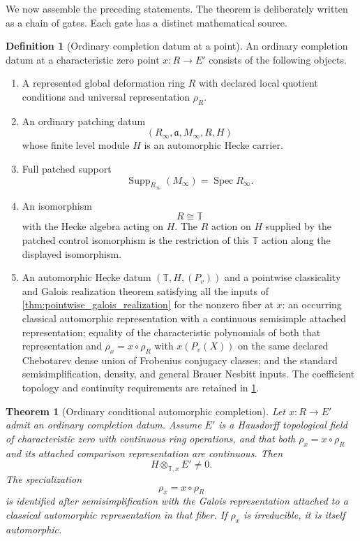 \documentclass[11pt]{amsart}
\newtheorem{theorem}{Theorem}[section]
\theoremstyle{definition}
\newtheorem{definition}[definition]{Definition}
\theoremstyle{remark}
\newcommand{\TT}{\mathbb T}
\newcommand{\Spec}{\operatorname{Spec}}
\newcommand{\Supp}{\operatorname{Supp}}
\newcommand{\fraka}{\mathfrak a}
\begin{document}
We now assemble the preceding statements. The theorem is deliberately written as a chain of gates. Each gate has a distinct mathematical source.

\begin{definition}[Ordinary completion datum at a point]\label{def:ordinary_completion_datum}
An ordinary completion datum at a characteristic zero point \(x:R\to E'\) consists of the following objects.
\begin{enumerate}
\item A represented global deformation ring \(R\) with declared local quotient conditions and universal representation \(\rho_R\).
\item An ordinary patching datum
\[
(R_\infty,\fraka,M_\infty,R,H)
\]
whose finite level module \(H\) is an automorphic Hecke carrier.
\item Full patched support
\[
\Supp_{R_\infty}(M_\infty)=\Spec R_\infty.
\]
\item An isomorphism
\[
R\cong\TT
\]
with the Hecke algebra acting on \(H\). The \(R\) action on \(H\) supplied by the patched control isomorphism is the restriction of this \(\TT\) action along the displayed isomorphism.
\item An automorphic Hecke datum \((\TT,H,(P_v))\) and a pointwise classicality and Galois realization theorem satisfying all the inputs of \cref{thm:pointwise_galois_realization} for the nonzero fiber at \(x\): an occurring classical automorphic representation with a continuous semisimple attached representation; equality of the characteristic polynomials of both that representation and \(\rho_x=x\circ\rho_R\) with \(x(P_v(X))\) on the same declared Chebotarev dense union of Frobenius conjugacy classes; and the standard semisimplification, density, and general Brauer Nesbitt inputs. The coefficient topology and continuity requirements are retained in \cref{thm:ordinary_conditional_completion}.
\end{enumerate}
\end{definition}

\begin{theorem}[Ordinary conditional automorphic completion]\label{thm:ordinary_conditional_completion}
Let \(x:R\to E'\) admit an ordinary completion datum. Assume \(E'\) is a Hausdorff topological field of characteristic zero with continuous ring operations, and that both \(\rho_x=x\circ\rho_R\) and its attached comparison representation are continuous. Then
\[
\boxed{
H\otimes_{\TT,x}E'\neq0.
}
\]
The specialization
\[
\rho_x=x\circ\rho_R
\]
is identified after semisimplification with the Galois representation attached to a classical automorphic representation in that fiber. If \(\rho_x\) is irreducible, it is itself automorphic.
\end{theorem}
\end{document}
